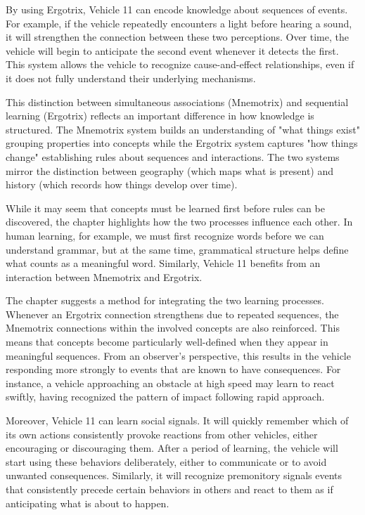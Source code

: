 \documentclass{article}
\begin{document}
	By using Ergotrix, Vehicle 11 can encode knowledge about sequences of events. For example, if the vehicle repeatedly encounters a light before hearing a sound, it will strengthen the connection between these two perceptions. Over time, the vehicle will begin to anticipate the second event whenever it detects the first. This system allows the vehicle to recognize cause-and-effect relationships, even if it does not fully understand their underlying mechanisms.

	This distinction between simultaneous associations (Mnemotrix) and sequential learning (Ergotrix) reflects an important difference in how knowledge is structured. The Mnemotrix system builds an understanding of "what things exist" grouping properties into concepts while the Ergotrix system captures "how things change" establishing rules about sequences and interactions. The two systems mirror the distinction between geography (which maps what is present) and history (which records how things develop over time).

	While it may seem that concepts must be learned first before rules can be discovered, the chapter highlights how the two processes influence each other. In human learning, for example, we must first recognize words before we can understand grammar, but at the same time, grammatical structure helps define what counts as a meaningful word. Similarly, Vehicle 11 benefits from an interaction between Mnemotrix and Ergotrix.

	The chapter suggests a method for integrating the two learning processes. Whenever an Ergotrix connection strengthens due to repeated sequences, the Mnemotrix connections within the involved concepts are also reinforced. This means that concepts become particularly well-defined when they appear in meaningful sequences. From an observer's perspective, this results in the vehicle responding more strongly to events that are known to have consequences. For instance, a vehicle approaching an obstacle at high speed may learn to react swiftly, having recognized the pattern of impact following rapid approach.

	Moreover, Vehicle 11 can learn social signals. It will quickly remember which of its own actions consistently provoke reactions from other vehicles, either encouraging or discouraging them. After a period of learning, the vehicle will start using these behaviors deliberately, either to communicate or to avoid unwanted consequences. Similarly, it will recognize premonitory signals events that consistently precede certain behaviors in others and react to them as if anticipating what is about to happen.
\end{document}
